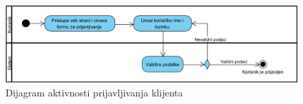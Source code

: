 \begin{figure}[H]
\begin{center}
\includegraphics[width=\textwidth]{Pictures/activity_user_login.png}
\end{center}
    \caption{Dijagram aktivnosti prijavljivanja klijenta}
\label{fig:ActivityUserLogin}
\end{figure}
